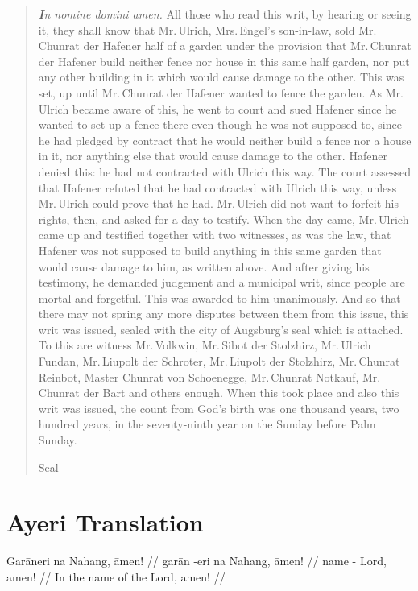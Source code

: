 \documentclass[12pt,paper=a4]{scrartcl}
\begin{document}
\blockquote{\emph{\textbf{I}n nomine domini amen.} All those who read this writ, by hearing or seeing it, they shall know that Mr.\,Ulrich, Mrs.\,Engel's son-in-law, sold Mr.\,Chunrat der Hafener half of a garden under the provision that Mr.\,Chunrat der Hafener build neither fence nor house in this same half garden, nor put any other building in it which would cause damage to the other. This was set, up until Mr.\,Chunrat der Hafener wanted to fence the garden. As Mr.\,Ulrich became aware of this, he went to court and sued Hafener since he wanted to set up a fence there even though he was not supposed to, since he had pledged by contract that he would neither build a fence nor a house in it, nor anything else that would cause damage to the other. Hafener denied this: he had not contracted with Ulrich this way. The court assessed that Hafener refuted that he had contracted with Ulrich this way, unless Mr.\,Ulrich could prove that he had. Mr.\,Ulrich did not want to forfeit his rights, then, and asked for a day to testify. When the day came, Mr.\,Ulrich came up and testified together with two witnesses, as was the law, that Hafener was not supposed to build anything in this same garden that would cause damage to him, as written above. And after giving his testimony, he demanded judgement and a municipal writ, since people are mortal and forgetful. This was awarded to him unanimously. And so that there may not spring any more disputes between them from this issue, this writ was issued, sealed with the city of Augsburg's seal which is attached. To this are witness Mr.\,Volkwin, Mr.\,Sibot der Stolzhirz, Mr.\,Ulrich Fundan, Mr.\,Liupolt der Schroter, Mr.\,Liupolt der Stolzhirz, Mr.\,Chunrat Reinbot, Master Chunrat von Schoenegge, Mr.\,Chunrat Notkauf, Mr.\,Chunrat der Bart and others enough. When this took place and also this writ was issued, the count from God's birth was one thousand years, two hundred years, in the seventy-ninth year on the Sunday before Palm Sunday.

\begin{center}
Seal
\end{center}}

\section{Ayeri Translation}

\ex \begingl
	\glpreamble Garāneri na Nahang, āmen! //
	\gla garān -eri na Nahang, āmen! //
	\glb name -\Ins{} \Gen{} Lord, amen! //
	\glft In the name of the Lord, amen! //
\endgl \xe
\end{document}
